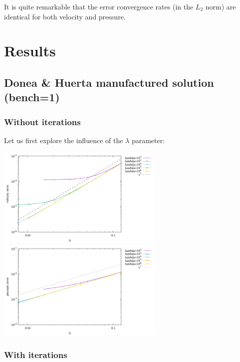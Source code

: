 It is quite remarkable that the error convergence rates (in the $L_2$ norm)
are identical for both velocity and pressure. 







\newpage
\section*{Results}

\subsection*{Donea \& Huerta manufactured solution (bench=1)}

\subsubsection*{Without iterations}

Let us first explore the influence of the $\lambda$ parameter:

\begin{center}
\includegraphics[width=8cm]{python_codes/fieldstone_161/results/bench1/single/errorsV.pdf}
\includegraphics[width=8cm]{python_codes/fieldstone_161/results/bench1/single/errorsP.pdf}\\
\end{center}

\subsubsection*{With iterations}

